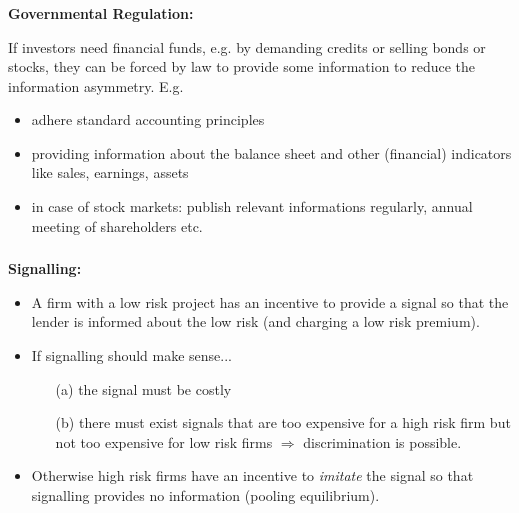\documentclass[11pt]{beamer}
\begin{document}

\begin{frame}
\frametitle{\insertsection}

\textbf{Governmental Regulation:}
\par\medskip

If investors need financial funds, e.g. by demanding credits or selling bonds or stocks, they can be forced by law to provide some information to reduce the information asymmetry. E.g.
\begin{itemize}
\item adhere standard accounting principles
\item providing information about the balance sheet and other (financial) indicators like sales, earnings, assets
\item in case of stock markets: publish relevant informations regularly, annual meeting of shareholders etc.
\end{itemize}
\label{govreg}
\end{frame}


\begin{frame}
\frametitle{\insertsection}

\textbf{Signalling:}

\begin{itemize}
\item A firm with a low risk project has an incentive to provide a signal so that the lender is informed about the low risk (and charging a low risk premium).

\item If signalling should make sense...
\begin{itemize}
\item[(a)] the signal must  be costly
\item[(b)] there must exist signals that are too expensive for a high risk firm but not too expensive for low risk firms $\Rightarrow$ discrimination is possible.
\end{itemize}

\item Otherwise high risk firms have an incentive to \textit{imitate} the signal so that signalling provides no information (pooling equilibrium).
\end{itemize}
\end{frame}

\end{document}

